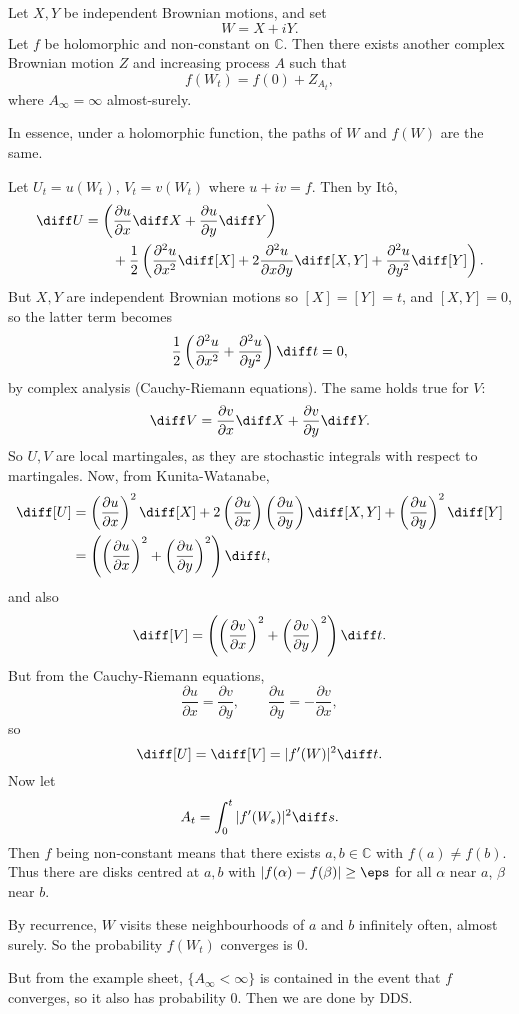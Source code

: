 \documentclass[12pt]{article}
\begin{document}
\begin{proposition}
	Let $X, Y$ be independent Brownian motions, and set
	\[
	W = X +  i Y.
	\]
	Let $f$ be holomorphic and non-constant on $\mathbb{C}$. Then there exists another complex Brownian motion $Z$ and increasing process $A$ such that
	\[
	f(W_t) = f(0) + Z_{A_t},
	\]
	where $A_\infty = \infty$ almost-surely.
\end{proposition}

In essence, under a holomorphic function, the paths of $W$ and $f(W)$ are the same.

\begin{proofbox}
	Let $U_t = u(W_t)$, $V_t = v(W_t)$ where $u + iv = f$. Then by It\^o,
	\begin{align*}
		\diff U &= \left( \frac{\partial u}{\partial x} \diff X + \frac{\partial u}{\partial y} \diff Y \right) \\
			&\qquad + \frac 12 \left( \frac{\partial^2 u}{\partial x^2} \diff [X] + 2 \frac{\partial^2 u}{\partial x \partial y} \diff [X, Y] + \frac{\partial^2 u}{\partial y^2} \diff [Y] \right).
	\end{align*}
	But $X, Y$ are independent Brownian motions so $[X] = [Y] = t$, and $[X, Y] = 0$, so the latter term becomes
	\[
	\frac 12 \left( \frac{\partial^2u}{\partial x^2} + \frac{\partial^2 u}{\partial y^2} \right) \diff t = 0,
	\]
	by complex analysis (Cauchy-Riemann equations). The same holds true for $V$:
	\[
	\diff V = \frac{\partial v}{\partial x} \diff X + \frac{\partial v}{\partial y} \diff Y.
	\]
	So $U, V$ are local martingales, as they are stochastic integrals with respect to martingales. Now, from Kunita-Watanabe,
	\begin{align*}
		\diff [U] &= \left( \frac{\partial u}{\partial x} \right)^2 \diff [X] + 2 \left( \frac{\partial u}{\partial x} \right) \left( \frac{\partial u}{\partial y} \right) \diff [X, Y] + \left( \frac{\partial u}{\partial y} \right)^2 \diff [Y] \\
			  &= \left( \left( \frac{\partial u}{\partial x} \right)^2 + \left( \frac{\partial u}{\partial y} \right)^2 \right) \diff t,
	\end{align*}
	and also
	\[
		\diff [V] = \left( \left( \frac{\partial v}{\partial x} \right)^2 + \left( \frac{\partial v}{\partial y} \right)^2 \right) \diff t.
	\]
	But from the Cauchy-Riemann equations,
	\[
	\frac{\partial u}{\partial x} = \frac{\partial v}{\partial y}, \qquad \frac{\partial u}{\partial y} = - \frac{\partial v}{\partial x},
	\]
	so
	\[
		\diff [U] = \diff [V] = |f'(W)|^2 \diff t.
	\]
	Now let
	\[
	A_t = \int_0^{t} |f'(W_s)|^2 \diff s.
	\]
	Then $f$ being non-constant means that there exists $a, b \in \mathbb{C}$ with $f(a) \neq f(b)$. Thus there are disks centred at $a, b$ with $|f(\alpha) - f(\beta)| \geq \eps$ for all $\alpha$ near $a$, $\beta$ near $b$.

	By recurrence, $W$ visits these neighbourhoods of $a$ and $b$ infinitely often, almost surely. So the probability $f(W_t)$ converges is $0$.

	But from the example sheet, $\{A_\infty < \infty\}$ is contained in the event that $f$ converges, so it also has probability $0$. Then we are done by DDS.
\end{proofbox}
\end{document}
